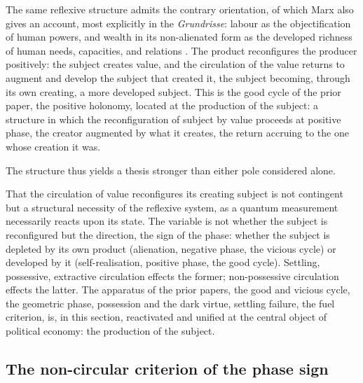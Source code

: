The same reflexive structure admits the contrary orientation, of which Marx also gives an account, most explicitly in the \emph{Grundrisse}: labour as the objectification of human powers, and wealth in its non-alienated form as the developed richness of human needs, capacities, and relations \parencite{marx1973}. The product reconfigures the producer positively: the subject creates value, and the circulation of the value returns to augment and develop the subject that created it, the subject becoming, through its own creating, a more developed subject. This is the good cycle of the prior paper, the positive holonomy, located at the production of the subject: a structure in which the reconfiguration of subject by value proceeds at positive phase, the creator augmented by what it creates, the return accruing to the one whose creation it was.

The structure thus yields a thesis stronger than either pole considered alone.

\begin{claim}
That the circulation of value reconfigures its creating subject is not contingent but a structural necessity of the reflexive system, as a quantum measurement necessarily reacts upon its state. The variable is not whether the subject is reconfigured but the direction, the sign of the phase: whether the subject is depleted by its own product (alienation, negative phase, the vicious cycle) or developed by it (self-realisation, positive phase, the good cycle). Settling, possessive, extractive circulation effects the former; non-possessive circulation effects the latter. The apparatus of the prior papers, the good and vicious cycle, the geometric phase, possession and the dark virtue, settling failure, the fuel criterion, is, in this section, reactivated and unified at the central object of political economy: the production of the subject.
\end{claim}

\subsection{The non-circular criterion of the phase sign}
\label{p10:sec:surplus}

